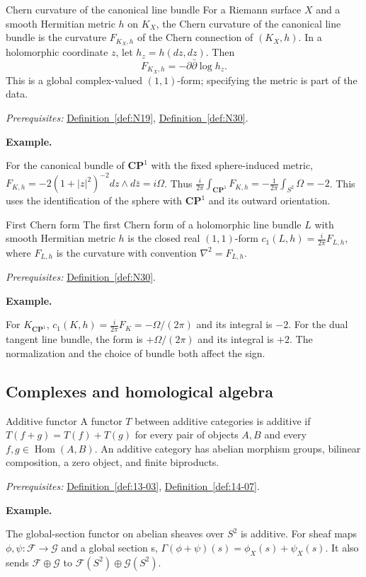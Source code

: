 \documentclass[11pt]{article}
\makeatletter
\newcounter{definition}
\newcommand{\CP}{\mathbf{CP}}
\newcommand{\exampleheading}{\par\medskip\textbf{Example.}\par\smallskip}
\newcommand{\currentdefinition}[1]{\protected@edef\@currentlabel{#1}}
\makeatother
\begin{document}
\begin{definitionbox}{Chern curvature of the canonical line bundle}
\currentdefinition{\thedefinition}
\label{def:B10}
For a Riemann surface $X$ and a smooth Hermitian metric $h$ on $K_X$, the Chern curvature of the canonical line bundle is the curvature $F_{K_X,h}$ of the Chern connection of $(K_X,h)$. In a holomorphic coordinate $z$, let $h_z=h(dz,dz)$. Then
\[F_{K_X,h}=-\partial\bar\partial\log h_z.\]
This is a global complex-valued $(1,1)$-form; specifying the metric is part of the data.

\smallskip
\textit{Prerequisites:} \hyperref[def:N19]{Definition~\ref*{def:N19}}, \hyperref[def:N30]{Definition~\ref*{def:N30}}.

\exampleheading
For the canonical bundle of $\CP^1$ with the fixed sphere-induced metric, $F_{K,h}=-2(1+|z|^2)^{-2}dz\wedge d\bar z=i\Omega$. Thus $\frac{i}{2\pi}\int_{\CP^1}F_{K,h}=-\frac1{2\pi}\int_{S^2}\Omega=-2$. This uses the identification of the sphere with $\CP^1$ and its outward orientation.
\end{definitionbox}

\begin{definitionbox}{First Chern form}
\currentdefinition{\thedefinition}
\label{def:B11}
The first Chern form of a holomorphic line bundle $L$ with smooth Hermitian metric $h$ is the closed real $(1,1)$-form $c_1(L,h)=\frac{i}{2\pi}F_{L,h}$, where $F_{L,h}$ is the curvature with convention $\nabla^2=F_{L,h}$.

\smallskip
\textit{Prerequisites:} \hyperref[def:N30]{Definition~\ref*{def:N30}}.

\exampleheading
For $K_{\CP^1}$, $c_1(K,h)=\frac{i}{2\pi}F_K=-\Omega/(2\pi)$ and its integral is $-2$. For the dual tangent line bundle, the form is $+\Omega/(2\pi)$ and its integral is $+2$. The normalization and the choice of bundle both affect the sign.
\end{definitionbox}

\subsection*{Complexes and homological algebra}

\begin{definitionbox}{Additive functor}
\currentdefinition{\thedefinition}
\label{def:17-01}
A functor $T$ between additive categories is additive if $T(f+g)=T(f)+T(g)$ for every pair of objects $A,B$ and every $f,g\in\operatorname{Hom}(A,B)$. An additive category has abelian morphism groups, bilinear composition, a zero object, and finite biproducts.

\smallskip
\textit{Prerequisites:} \hyperref[def:13-03]{Definition~\ref*{def:13-03}}, \hyperref[def:14-07]{Definition~\ref*{def:14-07}}.

\exampleheading
The global-section functor on abelian sheaves over $S^2$ is additive. For sheaf maps $\phi,\psi:\mathcal F\to\mathcal G$ and a global section s, $\Gamma(\phi+\psi)(s)=\phi_X(s)+\psi_X(s)$. It also sends $\mathcal F\oplus\mathcal G$ to $\mathcal F(S^2)\oplus\mathcal G(S^2)$.
\end{definitionbox}
\end{document}
